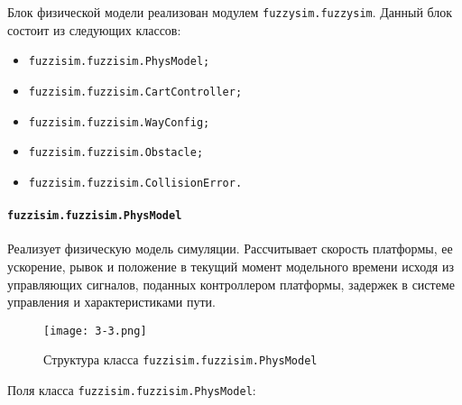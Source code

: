 Блок физической модели реализован модулем \lstinline!fuzzysim.fuzzysim!. Данный блок состоит из следующих классов:

\begin{itemize}
	\item \lstinline!fuzzisim.fuzzisim.PhysModel;!
	\item \lstinline!fuzzisim.fuzzisim.CartController;!
	\item \lstinline!fuzzisim.fuzzisim.WayConfig;!
	\item \lstinline!fuzzisim.fuzzisim.Obstacle;!
	\item \lstinline!fuzzisim.fuzzisim.CollisionError.!
\end{itemize}

\paragraph{\lstinline!fuzzisim.fuzzisim.PhysModel!}

Реализует физическую модель симуляции. Рассчитывает скорость платформы, ее ускорение, рывок и положение в текущий момент модельного времени исходя из управляющих сигналов, поданных контроллером платформы, задержек в системе управления и характеристиками пути.

\begin{figure}[ht]
    \centering
    \texttt{[image: 3-3.png]}
    \caption{  Структура класса \lstinline!fuzzisim.fuzzisim.PhysModel! }
    \label{fig:domain:1:1}
\end{figure}

Поля класса \lstinline!fuzzisim.fuzzisim.PhysModel!:

